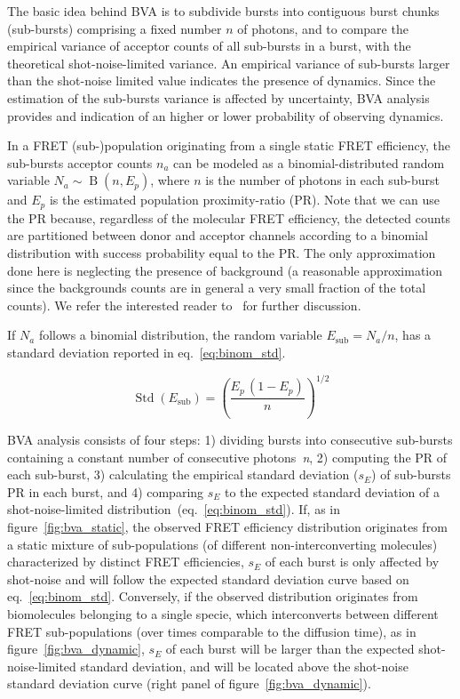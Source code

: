 \documentclass[10pt,letterpaper]{article}
\begin{document}
The basic idea behind BVA is to subdivide bursts into contiguous burst chunks (sub-bursts)
comprising a fixed number $n$ of photons,
and to compare the empirical variance of acceptor counts of all sub-bursts in a burst,
with the theoretical shot-noise-limited variance.
An empirical variance of sub-bursts larger than the shot-noise limited value indicates
the presence of dynamics. Since the estimation of the sub-bursts variance is affected
by uncertainty, BVA analysis provides and indication of an higher or lower probability
of observing dynamics.

In a FRET (sub-)population originating from a single static FRET efficiency,
the sub-bursts acceptor counts $n_a$ can be modeled as a binomial-distributed random variable
$N_a \sim \operatorname{B}(n, E_p)$, where $n$ is the number of photons in each sub-burst and
$E_p$ is the estimated population proximity-ratio (PR).
Note that we can use the PR because, regardless of the molecular FRET efficiency,
the detected counts are partitioned between donor and acceptor channels according to
a binomial distribution with success probability equal to the PR.
The only approximation done here is neglecting the presence of background
(a reasonable approximation since the backgrounds counts are in general a
very small fraction of the total counts).
We refer the interested reader to~\cite{Torella_2011} for further discussion.

If $N_a$ follows a binomial distribution, the random variable $E_{\textrm{sub}} = N_a/n$,
has a standard deviation reported in eq.~\ref{eq:binom_std}.

\begin{equation}
\label{eq:binom_std}
\operatorname{Std}(E_{\textrm{sub}}) = \left( \frac{E_p\,(1 - E_p)}{n} \right)^{1/2}
\end{equation}

BVA analysis consists of four steps: 1) dividing bursts into consecutive sub-bursts
containing a constant number of consecutive photons~\textit{n}, 2) computing the PR
of each sub-burst, 3) calculating the empirical standard deviation ($s_E$) of sub-bursts
PR in each burst, and 4) comparing $s_E$ to the expected standard deviation
of a shot-noise-limited distribution~(eq.~\ref{eq:binom_std}).
If, as in figure~\ref{fig:bva_static}, the observed FRET efficiency distribution
originates from a static mixture of sub-populations (of different
non-interconverting molecules) characterized by distinct FRET efficiencies,
$s_E$ of each burst is only affected by shot-noise and will follow the expected
standard deviation curve based on eq.~\ref{eq:binom_std}.
Conversely, if the observed distribution originates from biomolecules belonging to a single specie,
which interconverts between different FRET sub-populations (over times comparable to the diffusion
time), as in figure~\ref{fig:bva_dynamic}, $s_E$ of each burst will be larger than the expected
shot-noise-limited standard deviation, and will be located above the shot-noise standard
deviation curve (right panel of figure~\ref{fig:bva_dynamic}).
\end{document}
